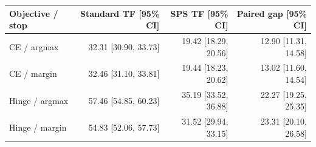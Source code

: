 \begin{tabular}{lrrr}
\toprule
Objective / stop & Standard TF [95\% CI] & SPS TF [95\% CI] & Paired gap [95\% CI] \\
\midrule
CE / argmax & 32.31 [30.90, 33.73] & 19.42 [18.29, 20.56] & 12.90 [11.31, 14.58] \\
CE / margin & 32.46 [31.10, 33.81] & 19.44 [18.23, 20.62] & 13.02 [11.60, 14.54] \\
Hinge / argmax & 57.46 [54.85, 60.23] & 35.19 [33.52, 36.88] & 22.27 [19.25, 25.35] \\
Hinge / margin & 54.83 [52.06, 57.73] & 31.52 [29.94, 33.15] & 23.31 [20.10, 26.58] \\
\bottomrule
\end{tabular}

